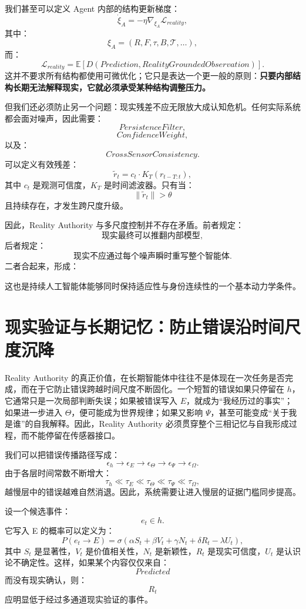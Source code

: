 我们甚至可以定义 Agent 内部的结构更新梯度：
\[
\dot{\xi}_A
=
-\eta
\nabla_{\xi_A}
\mathcal L_{reality},
\]
其中：
\[
\xi_A
=
(R,F,\tau,B,\mathcal T,\ldots),
\]
而：
\[
\mathcal L_{reality}
=
\mathbb E
\left[
D(
Prediction,
RealityGroundedObservation
)
\right].
\]
这并不要求所有结构都使用可微优化；它只是表达一个更一般的原则：\textbf{只要内部结构长期无法解释现实，它就必须承受某种结构调整压力。}

但我们还必须防止另一个问题：现实残差不应无限放大成认知危机。任何实际系统都会面对噪声，因此需要：
\[
PersistenceFilter,
\]
\[
ConfidenceWeight,
\]
以及：
\[
CrossSensorConsistency.
\]
可以定义有效残差：
\[
\tilde r_t
=
c_t
\cdot
K_T(r_{t-T:t}),
\]
其中 $c_t$ 是观测可信度，$K_T$ 是时间滤波器。只有当：
\[
\|\tilde r_t\|>\theta
\]
且持续存在，才发生跨尺度升级。

因此，Reality Authority 与多尺度控制并不存在矛盾。前者规定：
\[
\text{现实最终可以推翻内部模型},
\]
后者规定：
\[
\text{现实不应通过每个噪声瞬时重写整个智能体}.
\]
二者合起来，形成：
\begin{statementbox}
\centering
{}
\end{statementbox}
这也是持续人工智能体能够同时保持适应性与身份连续性的一个基本动力学条件。

\section{现实验证与长期记忆：防止错误沿时间尺度沉降}

Reality Authority 的真正价值，在长期智能体中往往不是体现在一次任务是否完成，而在于它防止错误跨越时间尺度不断固化。一个短暂的错误如果只停留在 $h$，它通常只是一次局部判断失误；如果被错误写入 $E$，就成为``我经历过的事实''；如果进一步进入 $\Theta$，便可能成为世界规律；如果又影响 $\Psi$，甚至可能变成``关于我是谁''的自我解释。因此，Reality Authority 必须贯穿整个三相记忆与自我形成过程，而不能停留在传感器接口。

我们可以把错误传播路径写成：
\[
\epsilon_h
\rightarrow
\epsilon_E
\rightarrow
\epsilon_\Theta
\rightarrow
\epsilon_\Psi
\rightarrow
\epsilon_\Omega.
\]
由于各层时间常数不断增大：
\[
\tau_h
\ll
\tau_E
\ll
\tau_\Theta
\ll
\tau_\Psi
\ll
\tau_\Omega,
\]
越慢层中的错误越难自然消退。因此，系统需要让进入慢层的证据门槛同步提高。

设一个候选事件：
\[
e_t\in h.
\]
它写入 E 的概率可以定义为：
\[
P(e_t\rightarrow E)
=
\sigma
\left(
\alpha S_t
+
\beta V_t
+
\gamma N_t
+
\delta R_t
-
\lambda U_t
\right),
\]
其中 $S_t$ 是显著性，$V_t$ 是价值相关性，$N_t$ 是新颖性，$R_t$ 是现实可信度，$U_t$ 是认识论不确定性。这样，如果某个内容仅仅来自：
\[
Predicted
\]
而没有现实确认，则：
\[
R_t
\]
应明显低于经过多通道现实验证的事件。


